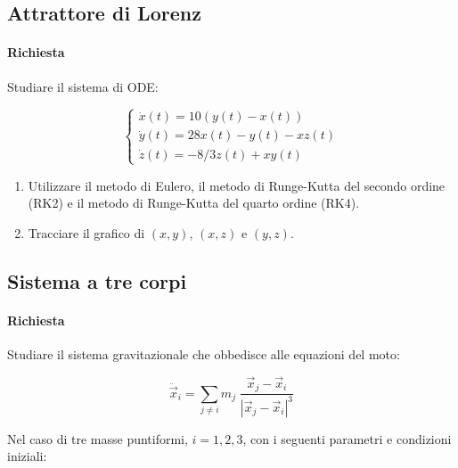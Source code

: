 \subsection{Attrattore di Lorenz}

\paragraph{Richiesta}

Studiare il sistema di ODE:

\begin{equation}
	\begin{cases}
		\dot{x}(t) = 10(y(t) - x(t))       \\
		\dot{y}(t) = 28x(t) - y(t) - xz(t) \\
		\dot{z}(t) = -8/3 z(t) + xy(t)
	\end{cases}
\end{equation}

\begin{enumerate}
	\item Utilizzare il metodo di Eulero, il metodo di Runge-Kutta del secondo ordine (RK2) e il metodo di Runge-Kutta del quarto ordine (RK4).
	\item Tracciare il grafico di $(x, y)$, $(x, z)$ e $(y, z)$.
\end{enumerate}

\subsection{Sistema a tre corpi}

\paragraph{Richiesta}

Studiare il sistema gravitazionale che obbedisce alle equazioni del moto:

\begin{equation}
	\ddot{\vec{x}}_i = \sum_{j \neq i} m_j \; \frac{ \vec{x}_j - \vec{x}_i}{|\vec{x}_j - \vec{x}_i|^3}
\end{equation}

Nel caso di tre masse puntiformi, $i = 1, 2, 3$, con i seguenti parametri e condizioni iniziali:

